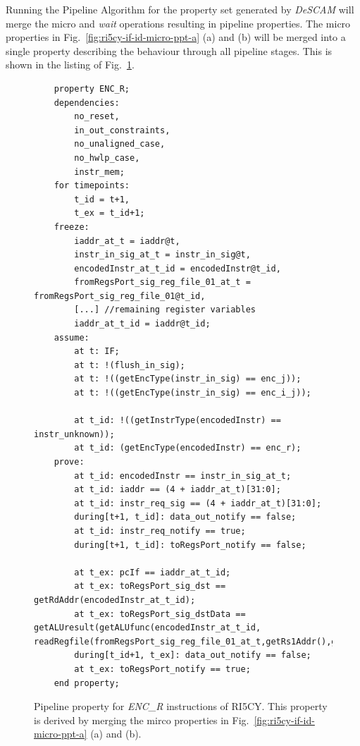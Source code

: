 Running the Pipeline Algorithm for the property set generated by \textit{DeSCAM} will merge the micro and \textit{wait} operations resulting in pipeline properties. The micro properties in Fig.~\ref{fig:ri5cy-if-id-micro-ppt-a} (a) and (b) will be merged into a single property describing the behaviour through all pipeline stages. This is shown in the listing of Fig.~\ref{fig:ri5cy-enc-r-ppt}.

\begin{figure}[htb!]
    \begin{lstlisting}
    property ENC_R;
    dependencies: 
        no_reset,
        in_out_constraints,
        no_unaligned_case,
        no_hwlp_case,
        instr_mem;
    for timepoints:
        t_id = t+1,
        t_ex = t_id+1;
    freeze:
        iaddr_at_t = iaddr@t,
        instr_in_sig_at_t = instr_in_sig@t,
        encodedInstr_at_t_id = encodedInstr@t_id,
        fromRegsPort_sig_reg_file_01_at_t = fromRegsPort_sig_reg_file_01@t_id,
        [...] //remaining register variables
        iaddr_at_t_id = iaddr@t_id;
    assume:
        at t: IF;
        at t: !(flush_in_sig);
        at t: !((getEncType(instr_in_sig) == enc_j));
        at t: !((getEncType(instr_in_sig) == enc_i_j));
        
        at t_id: !((getInstrType(encodedInstr) == instr_unknown));
        at t_id: (getEncType(encodedInstr) == enc_r);
    prove:
        at t_id: encodedInstr == instr_in_sig_at_t;
        at t_id: iaddr == (4 + iaddr_at_t)[31:0];
        at t_id: instr_req_sig == (4 + iaddr_at_t)[31:0];
        during[t+1, t_id]: data_out_notify == false;
        at t_id: instr_req_notify == true;
        during[t+1, t_id]: toRegsPort_notify == false;
        
        at t_ex: pcIf == iaddr_at_t_id;
        at t_ex: toRegsPort_sig_dst == getRdAddr(encodedInstr_at_t_id);
        at t_ex: toRegsPort_sig_dstData == getALUresult(getALUfunc(encodedInstr_at_t_id, readRegfile(fromRegsPort_sig_reg_file_01_at_t,getRs1Addr(),getRs2Addr()));
        during[t_id+1, t_ex]: data_out_notify == false;
        at t_ex: toRegsPort_notify == true;
    end property;\end{lstlisting}
    \caption{Pipeline property for \textit{ENC\_R} instructions of RI5CY. This property is derived by merging the mirco properties in Fig.~\ref{fig:ri5cy-if-id-micro-ppt-a} (a) and (b).}
    \label{fig:ri5cy-enc-r-ppt}
\end{figure}

